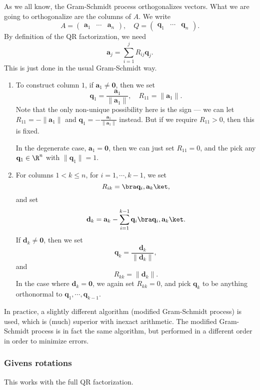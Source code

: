 \documentclass[a4paper]{article}
\begin{document}
As we all know, the Gram-Schmidt process orthogonalizes vectors. What we are going to orthogonalize are the columns of $A$. We write
\[
  A =
  \begin{pmatrix}
    \mathbf{a}_1 & \cdots & \mathbf{a}_n
  \end{pmatrix},\quad
  Q =
  \begin{pmatrix}
    \mathbf{q}_1 & \cdots & \mathbf{q}_n
  \end{pmatrix}.
\]
By definition of the QR factorization, we need
\[
  \mathbf{a}_j = \sum_{i = 1}^j R_{ij} \mathbf{q}_j.
\]
This is just done in the usual Gram-Schmidt way.
\begin{enumerate}
  \item To construct column $1$, if $\mathbf{a}_1 \not= \mathbf{0}$, then we set
    \[
      \mathbf{q}_1 = \frac{\mathbf{a}_1}{\|\mathbf{a}_1\|},\quad R_{11} = \|\mathbf{a}_1\|.
    \]
    Note that the only non-unique possibility here is the sign --- we can let $R_{11} = - \|\mathbf{a}_1\|$ and $\mathbf{q}_1 = -\frac{\mathbf{a}_1}{\|\mathbf{a}_1\|}$ instead. But if we require $R_{11} > 0$, then this is fixed.

    In the degenerate case, $\mathbf{a}_1 = \mathbf{0}$, then we can just set $R_{11} = 0$, and the pick any $\mathbf{q}_1 \in \R^n$ with $\|\mathbf{q}_1\| = 1$.
  \item For columns $1 < k \leq n$, for $i = 1, \cdots, k - 1$, we set
    \[
      R_{ik} = \bra \mathbf{q}_i, \mathbf{a}_k\ket,
    \]
    and set
    \[
      \mathbf{d}_k = \mathbf{a}_k - \sum_{i = 1}^{k - 1} \mathbf{q}_i \bra \mathbf{q}_i, \mathbf{a}_k\ket.
    \]
    If $\mathbf{d}_k \not= \mathbf{0}$, then we set
    \[
      \mathbf{q}_k = \frac{\mathbf{d}_k}{\|\mathbf{d}_k\|},
    \]
    and
    \[
      R_{kk} = \|\mathbf{d}_k\|.
    \]
    In the case where $\mathbf{d}_k = \mathbf{0}$, we again set $R_{kk} = 0$, and pick $\mathbf{q}_k$ to be anything orthonormal to $\mathbf{q}_1, \cdots, \mathbf{q}_{k - 1}$.
\end{enumerate}

In practice, a slightly different algorithm (modified Gram-Schmidt process) is used, which is (much) superior with inexact arithmetic. The modified Gram-Schmidt process is in fact the same algorithm, but performed in a different order in order to minimize errors.

\subsubsection*{Givens rotations}
This works with the full QR factorization.
\end{document}
